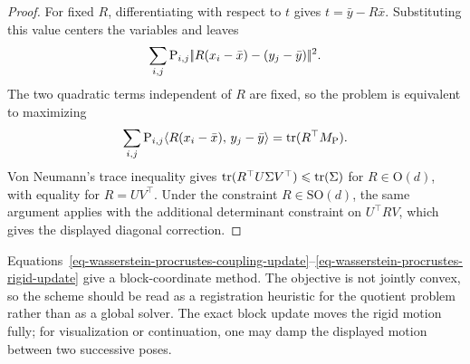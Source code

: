 \begin{proof}
	For fixed $R$, differentiating with respect to $t$ gives $t=\bar y-R\bar x$. Substituting this value centers the variables and leaves
	\[
		\sum_{i,j}\mathrm{P}_{i,j}|\!| R(x_i-\bar x)-(y_j-\bar y) |\!|^2.
	\]
	The two quadratic terms independent of $R$ are fixed, so the problem is equivalent to maximizing
	\[
		\sum_{i,j}\mathrm{P}_{i,j}\langle R(x_i-\bar x),\,y_j-\bar y\rangle
		=
		\operatorname{tr}(R^\top M_{\mathrm{P}}).
	\]
	Von Neumann's trace inequality gives $\operatorname{tr}(R^\top U\Sigma V^\top)\leqslant\operatorname{tr}(\Sigma)$ for $R\in\mathrm O(d)$, with equality for $R=UV^\top$. Under the constraint $R\in\mathrm{SO}(d)$, the same argument applies with the additional determinant constraint on $U^\top R V$, which gives the displayed diagonal correction.
	\end{proof}

	Equations~\eqref{eq-wasserstein-procrustes-coupling-update}--\eqref{eq-wasserstein-procrustes-rigid-update} give a block-coordinate method. The objective is not jointly convex, so the scheme should be read as a registration heuristic for the quotient problem rather than as a global solver. The exact block update moves the rigid motion fully; for visualization or continuation, one may damp the displayed motion between two successive poses.

